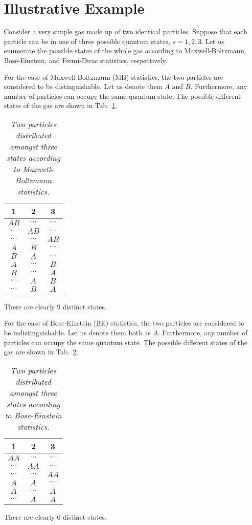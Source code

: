 \section{Illustrative Example}
Consider a very simple gas made up of two identical particles. Suppose
that each particle can be in one of three possible quantum states, $s=1,2,3$. 
Let us enumerate the possible states of the whole gas according to
Maxwell-Boltzmann, Bose-Einstein, and Fermi-Dirac statistics, respectively.

For the case of Maxwell-Boltzmann (MB) statistics, the two particles are
considered to be distinguishable. Let us denote them $A$ and $B$.
Furthermore, any number of particles can occupy the same quantum state. 
The possible different states of the gas are shown in Tab.~\ref{tmb}.
\begin{table}[h]\centering
\begin{tabular}{ccc}\hline 1&2&3 \\\hline
$AB$     & $\cdots$ & $\cdots$ \\
$\cdots$ & $AB$     & $\cdots$ \\
$\cdots$ & $\cdots$ & $AB$     \\
$A$      & $B$      & $\cdots$ \\
$B$      & $A$      & $\cdots$ \\
$A$      & $\cdots$ & $B$      \\
$B$      & $\cdots$ & $A$      \\
$\cdots$ & $A$      & $B$      \\
$\cdots$ & $B$      & $A$      \\\hline
\end{tabular}
\caption{\em Two particles distributed amongst three states according to
Maxwell-Boltzmann statistics.}\label{tmb}
\end{table}
There are clearly 9 distinct states.

For the case of Bose-Einstein (BE) statistics, the two particles are
considered to be indistinguishable. Let us denote them both as $A$.
Furthermore, any number of particles can occupy the same quantum state. 
The possible different states of the gas are shown in Tab.~\ref{tbe}.
\begin{table}[h]\centering
\begin{tabular}{ccc}\hline 1&2&3 \\\hline
$AA$     & $\cdots$ & $\cdots$ \\
$\cdots$ & $AA$     & $\cdots$ \\
$\cdots$ & $\cdots$ & $AA$     \\
$A$      & $A$      & $\cdots$ \\
$A$      & $\cdots$ & $A$      \\
$\cdots$ & $A$      & $A$      \\\hline
\end{tabular}
\caption{\em Two particles distributed amongst three states according to
Bose-Einstein statistics.}\label{tbe}
\end{table}
There are clearly 6 distinct states.

